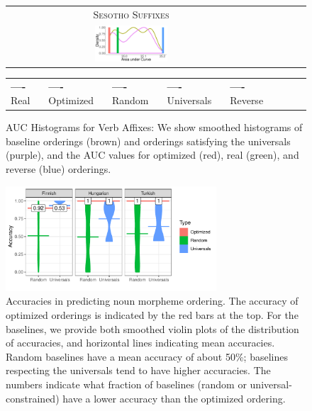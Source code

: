 \documentclass[man]{apa7}
\begin{document}
\begin{figure}
\begin{center}
\begin{tabular}{cccccc}
            \\
            \textsc{Sesotho Suffixes} \\
            \includegraphics[width=0.3\textwidth]{figures/sesotho_suffixes/suffixes-byMorphemes-auc-hist-heldout-Coarse-FineSurprisal-optimized.pdf}
    \end{tabular}

    \begin{tabular}{llllllll}
\textbf{\textcolor{real}{----}} Real&
\textbf{\textcolor{optimized}{----}} Optimized&
\textbf{\textcolor{random}{----}} Random&
\textbf{\textcolor{universals}{----}} Universals&
\textbf{\textcolor{reverse}{----}} Reverse
\end{tabular}
    \end{center}
    \caption{AUC Histograms for Verb Affixes: We show smoothed histograms of baseline orderings (brown) and orderings satisfying the universals (purple), and the AUC values for optimized (red), real (green), and reverse (blue) orderings. %
	}
    \label{fig:auc_verbs}
\end{figure}


\begin{figure}[]
    \centering
\includegraphics[width=0.7\textwidth]{figures/accuracies_nouns.pdf}
    \caption{Accuracies in predicting noun morpheme ordering.
The accuracy of optimized orderings is indicated by the red bars at the top.
    For the baselines, we provide both smoothed violin plots of the distribution of accuracies, and horizontal lines indicating mean accuracies.
    Random baselines have a mean accuracy of about 50\%; baselines respecting the universals tend to have higher accuracies.
	The numbers indicate what fraction of baselines (random or universal-constrained) have a lower accuracy than the optimized ordering.}
    \label{tab:optimized_acc_nouns}
\end{figure}
\end{document}

